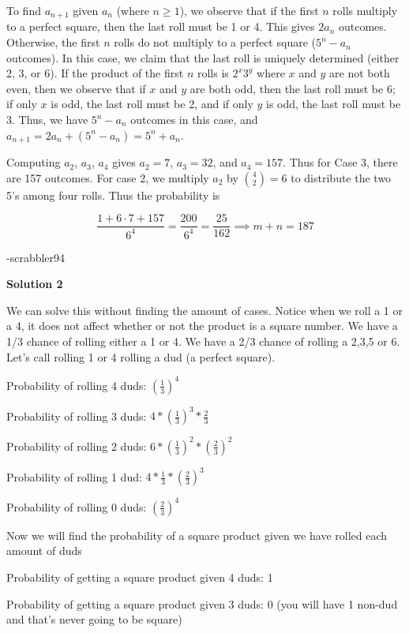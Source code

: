 \begin{enumerate}
 To find $a_{n+1}$ given $a_n$ (where $n \ge 1$), we observe that if the first $n$ rolls multiply to a perfect square, then the last roll must be 1 or 4. This gives $2a_n$ outcomes. Otherwise, the first $n$ rolls do not multiply to a perfect square ($5^n - a_n$ outcomes). In this case, we claim that the last roll is uniquely determined (either 2, 3, or 6). If the product of the first $n$ rolls is $2^x 3^y$ where $x$ and $y$ are not both even, then we observe that if $x$ and $y$ are both odd, then the last roll must be 6; if only $x$ is odd, the last roll must be 2, and if only $y$ is odd, the last roll must be 3. Thus, we have $5^n - a_n$ outcomes in this case, and $a_{n+1} = 2a_n + (5^n - a_n) = 5^n + a_n$.

 Computing $a_2$, $a_3$, $a_4$ gives $a_2 = 7$, $a_3 = 32$, and $a_4 = 157$. Thus for Case 3, there are 157 outcomes. For case 2, we multiply $a_2$ by $\binom{4}{2} = 6$ to distribute the two 5's among four rolls. Thus the probability is

 
 \[\frac{1 + 6 \cdot 7 + 157}{6^4} = \frac{200}{6^4} = \frac{25}{162} \implies m+n = \boxed{187}\]

 -scrabbler94

 



\textbf{Solution 2}

We can solve this without finding the amount of cases. Notice when we roll a 1 or a 4, it does not affect whether or not the product is a square number. We have a 1/3 chance of rolling either a 1 or 4. We have a 2/3 chance of rolling a 2,3,5 or 6. Let's call rolling 1 or 4 rolling a dud (a perfect square). 

 Probability of rolling 4 duds: $\left(\frac{1}{3}\right)^4$

 Probability of rolling 3 duds: $4 * \left(\frac{1}{3}\right)^3 * \frac{2}{3}$

 Probability of rolling 2 duds: $6 * \left(\frac{1}{3}\right)^2 * \left(\frac{2}{3}\right)^2$

 Probability of rolling 1 dud: $4 * \frac{1}{3} * \left(\frac{2}{3}\right)^3$

 Probability of rolling 0 duds: $\left(\frac{2}{3}\right)^4$

 Now we will find the probability of a square product given we have rolled each amount of duds

 Probability of getting a square product given 4 duds: 1

 Probability of getting a square product given 3 duds: 0 (you will have 1 non-dud and that's never going to be square)


\end{enumerate}
